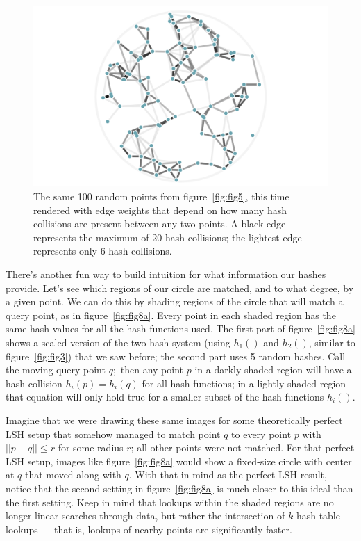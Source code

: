 \documentclass[20pt,]{extarticle}
\begin{document}
\begin{figure}
\centering
\includegraphics{images/lsh_image6.png}
\caption{The same 100 random points from figure~\ref{fig:fig5}, this
time rendered with edge weights that depend on how many hash collisions
are present between any two points. A black edge represents the maximum
of 20 hash collisions; the lightest edge represents only 6 hash
collisions.}\label{fig:fig6}
\end{figure}

There's another fun way to build intuition for what information our
hashes provide. Let's see which regions of our circle are matched, and
to what degree, by a given point. We can do this by shading regions of
the circle that will match a query point, as in figure~\ref{fig:fig8a}.
Every point in each shaded region has the same hash values for all the
hash functions used. The first part of figure~\ref{fig:fig8a} shows a
scaled version of the two-hash system (using \(h_1()\) and \(h_2()\),
similar to figure~\ref{fig:fig3}) that we saw before; the second part
uses 5 random hashes. Call the moving query point \(q;\) then any point
\(p\) in a darkly shaded region will have a hash collision
\(h_i(p) = h_i(q)\) for all hash functions; in a lightly shaded region
that equation will only hold true for a smaller subset of the hash
functions \(h_i().\)

Imagine that we were drawing these same images for some theoretically
perfect LSH setup that somehow managed to match point \(q\) to every
point \(p\) with \(||p-q||\le r\) for some radius \(r\); all other
points were not matched. For that perfect LSH setup, images like
figure~\ref{fig:fig8a} would show a fixed-size circle with center at
\(q\) that moved along with \(q\). With that in mind as the perfect LSH
result, notice that the second setting in figure~\ref{fig:fig8a} is much
closer to this ideal than the first setting. Keep in mind that lookups
within the shaded regions are no longer linear searches through data,
but rather the intersection of \(k\) hash table lookups --- that is,
lookups of nearby points are significantly faster.
\end{document}
